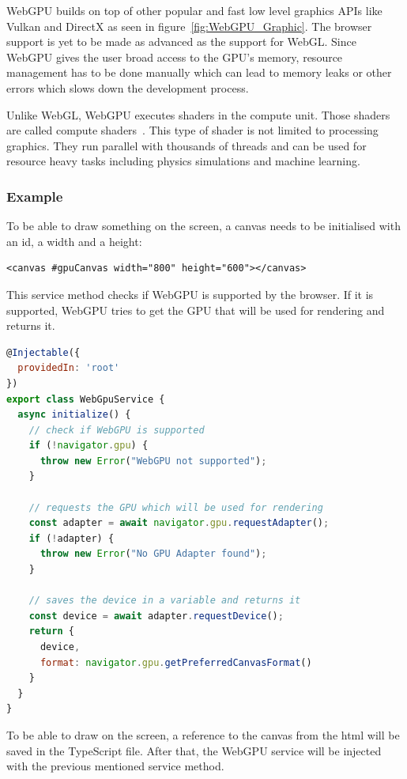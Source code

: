WebGPU builds on top of other popular and fast low level graphics APIs like Vulkan and DirectX as seen in figure~\ref{fig:WebGPU_Graphic}. The browser support is yet to be made as advanced as the support for WebGL\@. Since WebGPU gives the user broad access to the GPU's memory, resource management has to be done manually which can lead to memory leaks or other errors which slows down the development process.\ \cite{Web:29}

Unlike WebGL, WebGPU executes shaders in the compute unit. Those shaders are called compute shaders\ \cite{Web:30}. This type of shader is not limited to processing graphics. They run parallel with thousands of threads and can be used for resource heavy tasks including physics simulations and machine learning.\ \cite{Web:31}

\subsubsection{Example}

To be able to draw something on the screen, a canvas needs to be initialised with an id, a width and a height:
\begin{lstlisting}[language={[AS]HTML}, caption=WebGPU Rectangle 1]
<canvas #gpuCanvas width="800" height="600"></canvas>
\end{lstlisting}

This service method checks if WebGPU is supported by the browser. If it is supported, WebGPU tries to get the GPU that will be used for rendering and returns it.

\begin{lstlisting}[language=JavaScript,caption=WebGPU Rectangle 2]
@Injectable({
  providedIn: 'root'
})
export class WebGpuService {
  async initialize() {
    // check if WebGPU is supported
    if (!navigator.gpu) {
      throw new Error("WebGPU not supported");
    }

    // requests the GPU which will be used for rendering
    const adapter = await navigator.gpu.requestAdapter();
    if (!adapter) {
      throw new Error("No GPU Adapter found");
    }

    // saves the device in a variable and returns it
    const device = await adapter.requestDevice();
    return {
      device,
      format: navigator.gpu.getPreferredCanvasFormat()
    }
  }
}
\end{lstlisting}

To be able to draw on the screen, a reference to the canvas from the html will be saved in the TypeScript file. After that, the WebGPU service will be injected with the previous mentioned service method.

